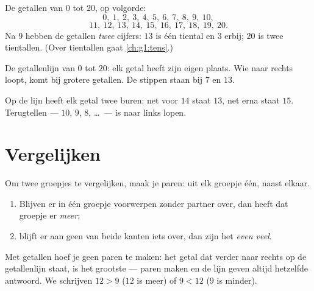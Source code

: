 \begin{example}\label{ex:g1:counting:writing}
De getallen van $0$ tot $20$, op volgorde:
\[
0,\ 1,\ 2,\ 3,\ 4,\ 5,\ 6,\ 7,\ 8,\ 9,\ 10,
\]
\[
11,\ 12,\ 13,\ 14,\ 15,\ 16,\ 17,\ 18,\ 19,\ 20 .
\]
Na $9$ hebben de getallen \emph{twee} cijfers: $13$ is één tiental en
$3$ erbij; $20$ is twee tientallen. (Over tientallen gaat
\cref{ch:g1:tens}.)
\end{example}

\begin{omfigure}

{\small De getallenlijn van $0$ tot $20$: elk getal heeft zijn eigen
plaats. Wie naar rechts loopt, komt bij grotere getallen. De stippen
staan bij $7$ en $13$.}
\end{omfigure}

\begin{example}\label{ex:g1:counting:neighbors}
Op de lijn heeft elk getal twee buren: net voor $14$ staat $13$, net
erna staat $15$. Terugtellen --- $10$, $9$, $8$, \dots\ --- is naar
links lopen.
\end{example}

\section{Vergelijken}

\begin{method}\label{met:g1:counting:compare}
Om twee groepjes te vergelijken, maak je paren: uit elk groepje één,
naast elkaar.
\begin{enumerate}
  \item Blijven er in één groepje voorwerpen zonder partner over, dan
        heeft dat groepje er \emph{meer};
  \item blijft er aan geen van beide kanten iets over, dan zijn het
        \emph{even veel}.
\end{enumerate}
Met getallen hoef je geen paren te maken: het getal dat verder naar
rechts op de getallenlijn staat, is het grootste --- paren maken en de
lijn geven altijd hetzelfde antwoord. We schrijven $12 > 9$ ($12$ is
meer) of $9 < 12$ ($9$ is minder).
\end{method}

